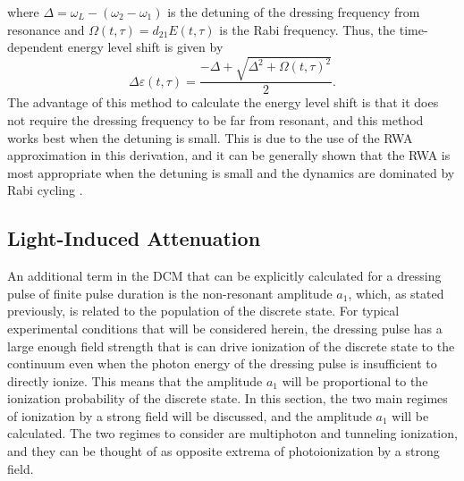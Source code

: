 where $\Delta=\omega_L-(\omega_2-\omega_1)$ is the detuning of the dressing frequency from resonance and $\Omega(t,\tau)=d_{21}E(t,\tau)$ is the Rabi frequency.  Thus, the time-dependent energy level shift is given by
\begin{equation}
	\Delta\varepsilon(t,\tau)=\frac{-\Delta+\sqrt{\Delta^2+\Omega(t,\tau)^2}}{2}.
\end{equation}
The advantage of this method to calculate the energy level shift is that it does not require the dressing frequency to be far from resonant, and this method works best when the detuning is small.  This is due to the use of the RWA approximation in this derivation, and it can be generally shown that the RWA is most appropriate when the detuning is small and the dynamics are dominated by Rabi cycling \cite{wuTheoryStrongfieldAttosecond2016,wuTimedomainPerspectiveAutlerTownes2013}.

\subsection{Light-Induced Attenuation}
\label{sec:LIA}
An additional term in the DCM that can be explicitly calculated for a dressing pulse of finite pulse duration is the non-resonant amplitude $a_1$, which,  as stated previously, is related to the population of the discrete state.  For typical experimental conditions that will be considered herein, the dressing pulse has a large enough field strength that is can drive ionization of the discrete state to the continuum even when the photon energy of the dressing pulse is insufficient to directly ionize.  This means that the amplitude $a_1$ will be proportional to the ionization probability of the discrete state.  In this section, the two main regimes of ionization by a strong field will be discussed, and the amplitude $a_1$ will be calculated. The two regimes to consider are multiphoton and tunneling ionization, and they can be thought of as opposite extrema of photoionization by a strong field.  


